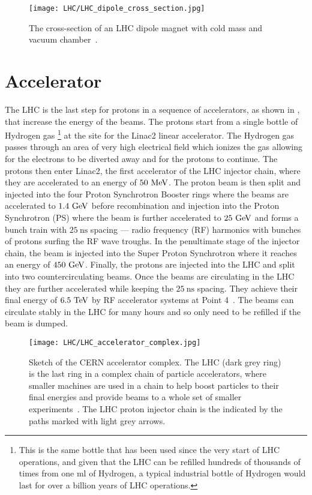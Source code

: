 \begin{figure}[htbp]
 \centering
 \texttt{[image: LHC/LHC\_dipole\_cross\_section.jpg]}
 \caption[The cross-section of an LHC dipole magnet with cold mass and vacuum chamber.]{%
  The cross-section of an LHC dipole magnet with cold mass and vacuum chamber~\cite{LHC:dipole}.}\label{fig:LHC_dipole_cross_section}
\end{figure}

\section{Accelerator}

The LHC is the last step for protons in a sequence of accelerators, as shown in , that increase the energy of the beams.
The protons start from a single bottle of Hydrogen gas%
\footnote{This is the same bottle that has been used since the very start of LHC operations, and given that the LHC can be refilled hundreds of thousands of times from one $\textrm{ml}$ of Hydrogen, a typical industrial bottle of Hydrogen would last for over a billion years of LHC operations.}
at the site for the Linac2 linear accelerator.
The Hydrogen gas passes through an area of very high electrical field which ionizes the gas allowing for the electrons to be diverted away and for the protons to continue.
The protons then enter Linac2, the first accelerator of the LHC injector chain, where they are accelerated to an energy of $50~\mathrm{MeV}$.
The proton beam is then split and injected into the four Proton Synchrotron Booster rings where the beams are accelerated to $1.4~\mathrm{GeV}$ before recombination and injection into the \Gls{Proton Synchrotron} (PS) where the beam is further accelerated to $25~\mathrm{GeV}$ and forms a bunch train with $25~\textrm{ns}$ spacing --- radio frequency (RF) harmonics with bunches of protons surfing the RF wave troughs.
In the penultimate stage of the injector chain, the beam is injected into the Super Proton Synchrotron where it reaches an energy of $450~\mathrm{GeV}$.
Finally, the protons are injected into the LHC and split into two countercirculating beams.
Once the beams are circulating in the LHC they are further accelerated while keeping the $25~\textrm{ns}$ spacing.
They achieve their final energy of $6.5~\mathrm{TeV}$ by RF accelerator systems at Point 4~\cite{Evans:2008,Boussard:410377}.
The beams can circulate stably in the LHC for many hours and so only need to be refilled if the beam is dumped.

\begin{figure}[htbp]
 \centering
 \texttt{[image: LHC/LHC\_accelerator\_complex.jpg]}
 \caption[Sketch of the CERN accelerator complex.]{%
  Sketch of the CERN accelerator complex.
  The LHC (dark grey ring) is the last ring in a complex chain of particle accelerators, where smaller machines are used in a chain to help boost particles to their final energies and provide beams to a whole set of smaller experiments~\cite{Haffner:1621894}.
  The LHC proton injector chain is the indicated by the paths marked with light grey arrows.}\label{fig:LHC_accelerator_complex}
\end{figure}

